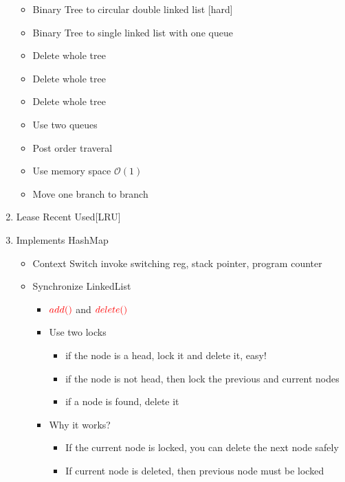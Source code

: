 \documentclass{article}
\begin{document}
\begin{enumerate}
\begin{itemize}
\item Binary Tree to circular double linked list [hard]
\item Binary Tree to single linked list with one queue
\item Delete whole tree
\item Delete whole tree
\item Delete whole tree

\item Use two queues 
\item Post order traveral
\item Use memory space $\mathcal{O}(1)$

\item Move one branch to branch 
\end{itemize}

\item Lease Recent Used[LRU] 
\item Implements HashMap  
\begin{itemize}
 \item Context Switch invoke switching reg, stack pointer, program counter  
\end{itemize}


\begin{itemize}
 \item Synchronize LinkedList 
 \begin{itemize}
  \item $\color{red}{add()}$ and $\color{red}{delete()}$  
  \item Use two locks
  \begin{itemize}
   \item if the node is a head, lock it and delete it, easy!
   \item if the node is not head, then lock the previous and current nodes 
   \item if a node is found, delete it
  \end{itemize}
  \item Why it works?
  \begin{itemize}
   \item If the current node is locked, you can delete the next node safely 
   \item If current node is deleted, then previous node must be locked
  \end{itemize}
 \end{itemize}


\end{itemize}
\end{enumerate}
\end{document}
